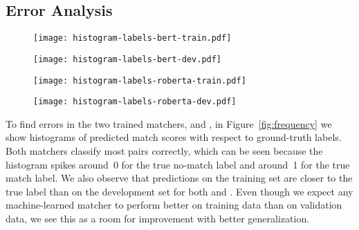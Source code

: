 \subsection{Error Analysis}

\begin{figure*}
    \centering
    \begin{subfigure}{0.42\textwidth}
        \centering
        \texttt{[image: histogram-labels-bert-train.pdf]}
        \label{subfig:bert_train}
    \end{subfigure}
    \hfill
    \begin{subfigure}{0.42\textwidth}
        \centering
        \texttt{[image: histogram-labels-bert-dev.pdf]}
        \label{subfig:bert_dev}
    \end{subfigure}
    \begin{subfigure}{0.42\textwidth}
        \centering
        \texttt{[image: histogram-labels-roberta-train.pdf]}
        \label{subfig:roberta_train}
    \end{subfigure}
    \hfill
    \begin{subfigure}{0.42\textwidth}
        \centering
        \texttt{[image: histogram-labels-roberta-dev.pdf]}
        \label{subfig:roberta_dev}
    \end{subfigure}
    \caption{Histograms of predicted labels on the training and validation sets for argument key point pairs with the \BertBase and \RobertaBase classifiers. For good classifiers, predicted labels should approximately equal the true label~(0~or~1).}
    \label{fig:frequency}
\end{figure*}
To find errors in the two trained matchers, \BertBase and \RobertaBase, in Figure~\ref{fig:frequency} we show histograms of predicted match scores with respect to ground-truth labels.
Both matchers classify most pairs correctly, which can be seen because the histogram spikes around~0 for the true no-match label and around~1 for the true match label.
We also observe that predictions on the training set are closer to the true label than on the development set for both \RobertaBase and \BertBase.
Even though we expect any machine-learned matcher to perform better on training data than on validation data, we see this as a room for improvement with better generalization.
